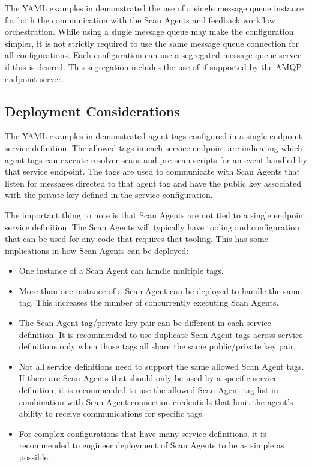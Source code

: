 The YAML examples in  demonstrated the use of a single
message queue instance for both the communication with the Scan Agents and feedback workflow
orchestration.  While using a single message queue may make the \cxoneflow configuration simpler, it is not
strictly required to use the same message queue connection for all configurations.  Each configuration can
use a segregated message queue server if this is desired.  This segregation includes the use
of  if supported by the AMQP endpoint server.


\subsection{Deployment Considerations}

The YAML examples in  demonstrated agent tags
configured in a single endpoint service definition.  The allowed tags in each service endpoint are
indicating which agent tags can execute resolver scans and pre-scan scripts for an event handled by that service endpoint.
The tags are used to communicate with Scan Agents that listen for messages directed to that agent tag and
have the public key associated with the private key defined in the service configuration.

The important thing to note is that Scan Agents are not tied to a single
\cxoneflow endpoint service definition.  The Scan Agents will typically have
tooling and configuration that can be used for any code that requires that tooling.  This
has some implications in how Scan Agents can be deployed:

\begin{itemize}
  \item One instance of a Scan Agent can handle multiple tags.
  
  \item More than one instance of a Scan Agent can be deployed to handle the same tag.  This increases the number of concurrently
  executing Scan Agents.

  \item The Scan Agent tag/private key pair can be different in each service definition.  It is recommended to
  use duplicate Scan Agent tags across \cxoneflow service definitions only when those tags all share the same public/private
  key pair.

  \item Not all service definitions need to support the same allowed Scan Agent tags.  If there are Scan Agents
  that should only be used by a specific service definition, it is recommended to use the allowed Scan Agent tag list
  in combination with Scan Agent connection credentials that limit the agent's ability to receive
  communications for specific tags.

  \item For complex \cxoneflow configurations that have many service definitions, it is recommended to engineer
  deployment of Scan Agents to be as simple as possible.
    
\end{itemize}


